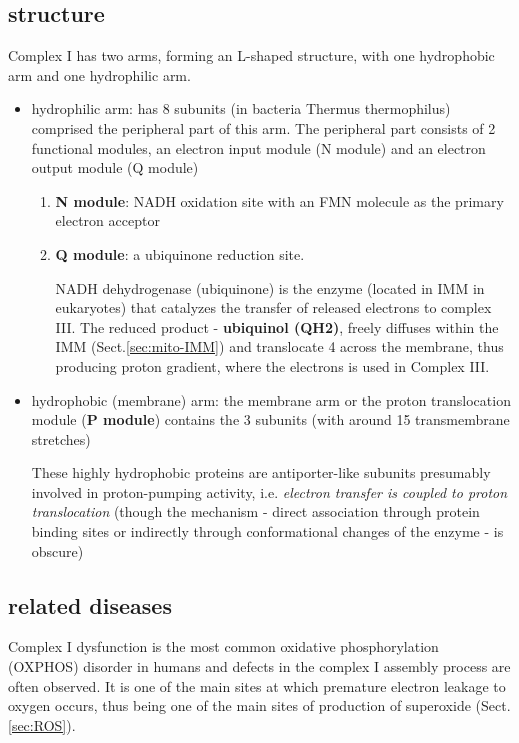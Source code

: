 \subsection{structure}
\label{sec:complex-I-structure}


Complex I has two arms, forming an L-shaped structure, with one hydrophobic arm
and one hydrophilic arm.
\begin{itemize}
  \item hydrophilic arm: has 8 subunits (in bacteria Thermus thermophilus)
  comprised the peripheral part of this arm. The peripheral part
  consists of 2 functional modules, an electron input module (N module)
  and an electron output module (Q module)

\begin{enumerate}
  \item {\bf N module}: NADH oxidation site with an FMN molecule as the primary
  electron acceptor

  \item {\bf Q module}: a ubiquinone reduction site.

NADH dehydrogenase (ubiquinone) is the enzyme (located in IMM in eukaryotes)
that catalyzes the transfer of released electrons to complex III.
The reduced product - {\bf ubiquinol (QH2)}, freely diffuses within
the IMM (Sect.\ref{sec:mito-IMM}) and translocate 4  across the membrane,
thus producing proton gradient, where the electrons is used in Complex III.

\end{enumerate}

  \item hydrophobic (membrane) arm:  the membrane arm or the proton
  translocation module ({\bf P module}) contains the 3 subunits (with around 15
  transmembrane stretches)

  These highly hydrophobic proteins are antiporter-like subunits presumably
  involved in proton-pumping activity, i.e. {\it electron transfer is coupled to
  proton translocation} (though the mechanism - direct association through
  protein binding sites or indirectly through conformational changes of the
  enzyme - is obscure)
\end{itemize}

\subsection{related diseases}

Complex I dysfunction is the most common oxidative phosphorylation (OXPHOS)
disorder in humans and defects in the complex I assembly process are often observed.
It is one of the main sites at which premature electron leakage to oxygen
occurs, thus being one of the main sites of production of superoxide
(Sect.\ref{sec:ROS}).

